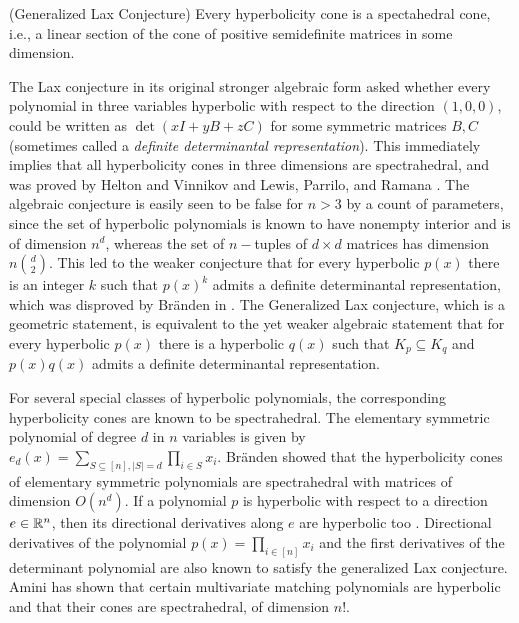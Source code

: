 \begin{conjecture} (Generalized Lax Conjecture)
Every hyperbolicity cone is a spectahedral cone, i.e., a linear section of the cone of positive semidefinite matrices in some dimension.
\end{conjecture}

The Lax conjecture in its original stronger algebraic form asked whether every
polynomial in three variables hyperbolic with respect to the
direction $(1,0,0)$, could be written as $\det(xI+yB+zC)$ for some symmetric
matrices $B,C$ (sometimes called a {\em definite determinantal representation}). This immediately implies that all hyperbolicity cones in three
dimensions are spectrahedral, and was proved by Helton and Vinnikov and Lewis,
Parrilo, and Ramana \cite{helton2007linear,lewis2005lax}. The algebraic
conjecture is easily seen to be false for $n>3$ by a count of parameters, since
the set of hyperbolic polynomials is known to have nonempty interior
\cite{nuij1969note} and is of dimension $n^d$, whereas the set of $n-$tuples of
$d\times d$ matrices has dimension $n\binom{d}{2}$. This led to the weaker
conjecture that for every hyperbolic $p(x)$ there is an integer $k$ such that
$p(x)^k$ admits a definite determinantal representation, which was disproved by Br\"anden in \cite{branden2011obstructions}.
The Generalized Lax conjecture, which is a geometric statement, is equivalent to the yet weaker algebraic statement
that for every hyperbolic $p(x)$ there is a hyperbolic $q(x)$ such that $K_p\subseteq K_q$ and
$p(x)q(x)$ admits a definite determinantal representation.

For several special classes of hyperbolic polynomials, the corresponding
hyperbolicity cones are known to be spectrahedral.  The elementary
symmetric polynomial of degree $d$ in $n$ variables is given by $e_d(x) =
\sum_{S \subseteq [n], |S| = d} \prod_{i \in S} x_i$. Br\"anden \cite{branden2014hyperbolicity} 
 showed that the hyperbolicity cones of
elementary symmetric polynomials are spectrahedral with matrices of dimension $O(n^d)$.  If a polynomial $p$ is
hyperbolic with respect to a direction $e \in \mathbb{R}^n$, then its directional
derivatives along $e$ are hyperbolic too \cite{gaarding1959inequality}.
Directional derivatives of the polynomial $p(x) = \prod_{i \in [n]} x_i$
\cite{zinchenko2008hyperbolicity,sanyal2013derivative,branden2014hyperbolicity,choe2004homogeneous}
and the first derivatives of the determinant polynomial \cite{saunderson2017spectrahedral} are also known to
satisfy the generalized Lax conjecture. Amini \cite{amini2016spectrahedrality} has shown that 
certain multivariate matching polynomials are hyperbolic and that their cones are spectrahedral, of
dimension $n!$. 

